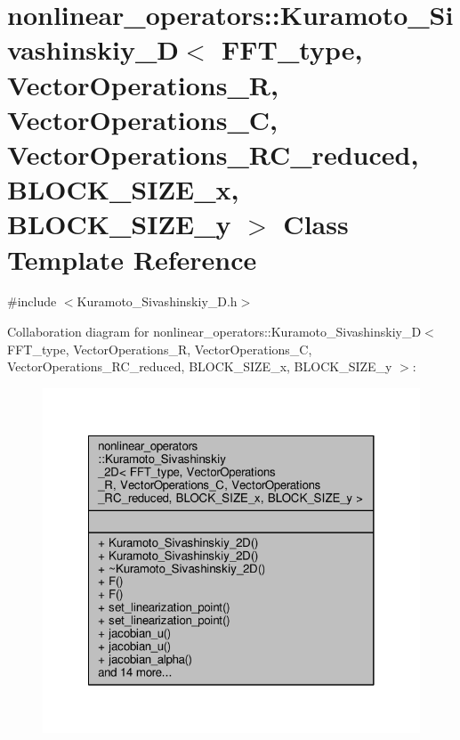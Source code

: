 \hypertarget{classnonlinear__operators_1_1Kuramoto__Sivashinskiy__2D}{\section{nonlinear\-\_\-operators\-:\-:Kuramoto\-\_\-\-Sivashinskiy\-\_\-D$<$ F\-F\-T\-\_\-type, Vector\-Operations\-\_\-\-R, Vector\-Operations\-\_\-\-C, Vector\-Operations\-\_\-\-R\-C\-\_\-reduced, B\-L\-O\-C\-K\-\_\-\-S\-I\-Z\-E\-\_\-x, B\-L\-O\-C\-K\-\_\-\-S\-I\-Z\-E\-\_\-y $>$ Class Template Reference}
\label{classnonlinear__operators_1_1Kuramoto__Sivashinskiy__2D}
}


{\ttfamily \#include $<$Kuramoto\-\_\-\-Sivashinskiy\-\_\-D.\-h$>$}



Collaboration diagram for nonlinear\-\_\-operators\-:\-:Kuramoto\-\_\-\-Sivashinskiy\-\_\-D$<$ F\-F\-T\-\_\-type, Vector\-Operations\-\_\-\-R, Vector\-Operations\-\_\-\-C, Vector\-Operations\-\_\-\-R\-C\-\_\-reduced, B\-L\-O\-C\-K\-\_\-\-S\-I\-Z\-E\-\_\-x, B\-L\-O\-C\-K\-\_\-\-S\-I\-Z\-E\-\_\-y $>$\-:\nopagebreak
\begin{figure}[H]
\begin{center}
\leavevmode
\includegraphics[width=320pt]{classnonlinear__operators_1_1Kuramoto__Sivashinskiy__2D__coll__graph}
\end{center}
\end{figure}
